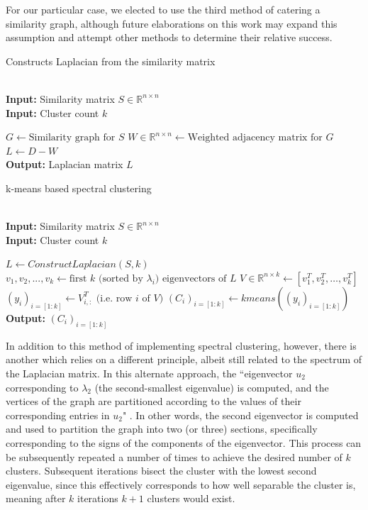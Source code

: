 \documentclass{article}
\begin{document}
For our particular case, we elected to use the third method of catering a similarity graph, although future elaborations on this work may expand this assumption and attempt other methods to determine their relative success. 

\begin{algorithm}
    
\caption{Constructs Laplacian from the similarity matrix \cite{spectral}}\label{alg:laplacian}
\begin{algorithmic}[1]
 \\
\textbf{Input:} Similarity matrix $S\in\mathbb{R}^{n\times n}$ \\
\textbf{Input:} Cluster count $k$

\State $G \gets \text{Similarity graph for } S$
\State $W\in\mathbb{R}^{n\times n} \gets \text{Weighted adjacency matrix for } G$
\State $L \gets D - W$ \\

\textbf{Output:} Laplacian matrix $L$
\EndProcedure
\end{algorithmic}
\end{algorithm}

\begin{algorithm}
\caption{k-means based spectral clustering \cite{spectral}}\label{alg:spectral-kmeans}
\begin{algorithmic}[1]
 \\
\textbf{Input:} Similarity matrix $S\in\mathbb{R}^{n\times n}$ \\
\textbf{Input:} Cluster count $k$

\State $L \gets ConstructLaplacian(S,k)$
\State $v_1,v_2,...,v_k \gets \text{first } k \text{ (sorted by } \lambda_i \text{) eigenvectors of } L$
\State $V\in\mathbb{R}^{n\times k} \gets [v_1^T, v_2^T,\dots,v_k^T]$
\State $(y_i)_{i=[1:k]} \gets V^T_{i,:} \text{ (i.e. row } i \text{ of } V\text{)}$
\State $(C_i)_{i=[1:k]} \gets kmeans((y_i)_{i=[1:k]})$ \\
\textbf{Output:} $(C_i)_{i=[1:k]}$
\EndProcedure
\end{algorithmic}
\end{algorithm}

In addition to this method of implementing spectral clustering, however, there is another which relies on a different principle, albeit still related to the spectrum of the Laplacian matrix. In this alternate approach, the ``eigenvector $u_2$ corresponding to $\lambda_2$ (the second-smallest eigenvalue) is computed, and the vertices of the graph are partitioned according to the values of their corresponding entries in $u_2$" \cite{bisection}. In other words, the second eigenvector is computed and used to partition the graph into two (or three) sections, specifically corresponding to the signs of the components of the eigenvector. This process can be subsequently repeated a number of times to achieve the desired number of $k$ clusters. Subsequent iterations bisect the cluster with the lowest second eigenvalue, since this effectively corresponds to how well separable the cluster is, meaning after $k$ iterations $k+1$ clusters would exist.
\end{document}
